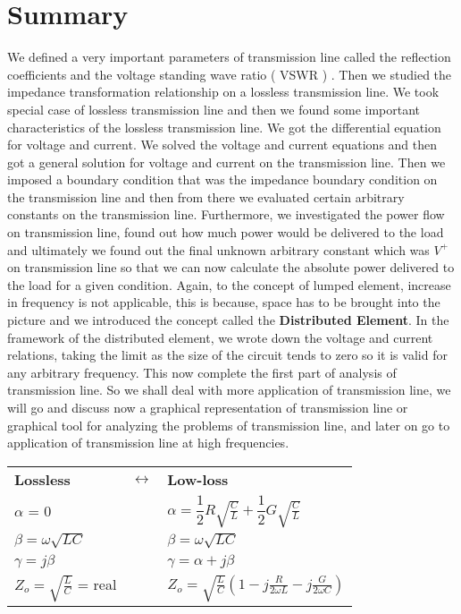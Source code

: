  \section{Summary}  
 We defined a very important parameters of transmission line called the reflection coefficients and the voltage standing wave ratio ( VSWR ) . Then we studied the impedance transformation relationship on a lossless transmission line. We took special case of lossless transmission line and then we found some important characteristics of the lossless transmission line. We got the differential equation for voltage and current. We solved the voltage and current equations and then got a general solution for voltage and current on the transmission line. Then we imposed a boundary condition that was the impedance boundary condition on the transmission line and then from there we evaluated certain arbitrary constants on the transmission line. Furthermore, we investigated the power flow on transmission line, found out how much power would be delivered to the load and ultimately we found out the final unknown arbitrary constant which was $V^+$ on transmission line so that we can now calculate the absolute power delivered to the load for a given condition. Again, to the concept of lumped element, increase in frequency is not applicable,  this is because, space has to be brought into the picture and we introduced the concept called the \textbf{Distributed Element}. In the framework of the distributed element, we wrote down the voltage and current relations, taking the limit as the size of the circuit tends to zero so it is valid for any arbitrary frequency. This now complete the first part of analysis of transmission line. So we shall deal with more application of transmission line, we will go and discuss now a graphical representation of transmission line or graphical tool for analyzing the problems of transmission line, and later on go to application of transmission line at high frequencies. 
 
 \begin{tabular}{l c l}
 	{\bf Lossless}&   	$\leftrightarrow$  & {\bf Low-loss}  \\ 
 	$\alpha$ = 0 &  & $\alpha = \dfrac{1}{2}R\sqrt{\frac{C}{L}} + \dfrac{1}{2}G\sqrt{\frac{C}{L}}$  \\
 	$\beta = \omega\sqrt{LC}$ & & $\beta = \omega\sqrt{LC}$\\
 	$\gamma = j\beta$ & & $\gamma = \alpha + j\beta$\\
 	$Z_o = \sqrt{\frac{L}{C}}$ = real &  & 	$Z_o = \sqrt{\frac{L}{C}}\left(1 - j\frac{R}{2\omega L} - j\frac{G}{2\omega C}\right)$
 \end{tabular} 



